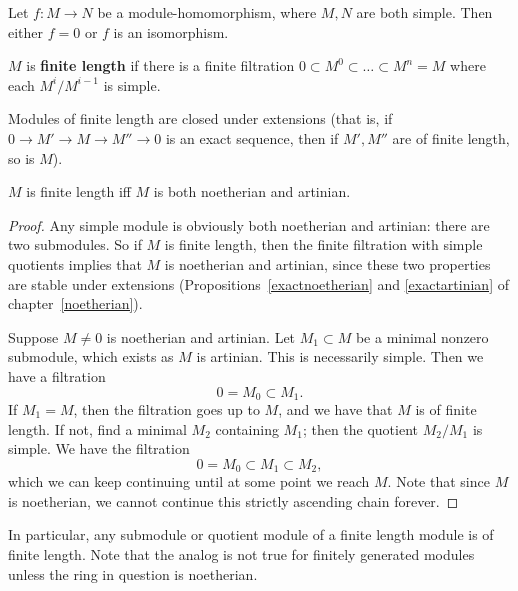 \begin{exercise} Let $f: M \to N$ be a module-homomorphism,
where $M, N$ are both simple. Then either $f =0$ or $f$ is an isomorphism. 
\end{exercise} 

\begin{definition} 
$M$ is \textbf{finite length} if there is a finite filtration $0 \subset M^0
\subset \dots \subset M^n = M$ where each $M^i/M^{i-1}$ is simple.
\end{definition} 

\begin{exercise} 
Modules of finite length are closed under extensions (that is, if $0 \to M'
\to M \to M'' \to 0$ is an exact sequence, then if $M', M''$ are of finite
length, so is $M$).  
\end{exercise} 

\begin{proposition} 
$M$ is finite length iff $M$ is both noetherian and artinian.
\end{proposition} 
\begin{proof} 
Any simple module is obviously both noetherian and artinian: there are two
submodules. So if $M$ is finite length, then the finite filtration with simple
quotients implies that $M$ is noetherian and artinian, since these two
properties are stable under extensions (Propositions~\ref{exactnoetherian}
and \ref{exactartinian} of chapter~\ref{noetherian}).

Suppose $M \neq 0$ is noetherian and artinian. Let $M_1 \subset M$ be a minimal
nonzero submodule, which exists as $M$ is artinian. This is necessarily simple. Then we have a filtration
\[ 0 = M_0 \subset M_1.  \]
If $M_1 = M$, then the filtration goes up to $M$, and we have that $M$ is of
finite length. If not, find a minimal $M_2$ containing $M_1$; then the quotient
$M_2/M_1$ is simple. We have the filtration
\[ 0 = M_0 \subset M_1 \subset M_2,  \]
which we can keep continuing until at some point we reach $M$. Note that since
$M$ is noetherian, we cannot continue this strictly ascending chain forever. 
\end{proof} 

\begin{exercise} 
In particular, any submodule or quotient module of a finite length module is
of finite length. Note that the analog is not true for finitely generated
modules unless the ring in question is noetherian.
\end{exercise} 

